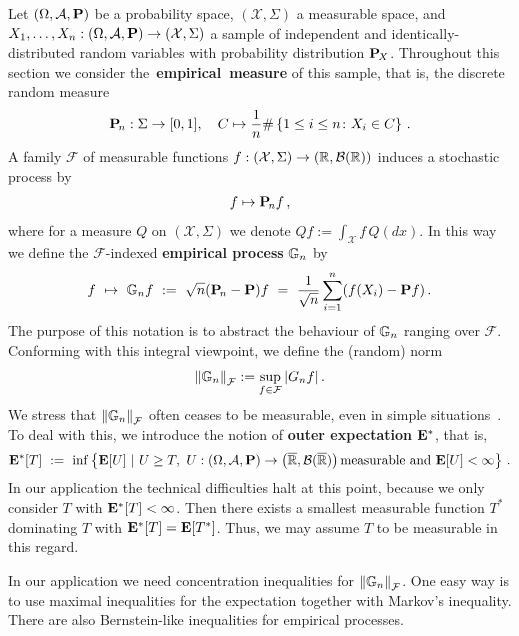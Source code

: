 
Let 
$
  \left( 
    \Omega,
    \mathcal{A},
    \P
  \right)
$
be a probability space,
$
  \left( 
    \mathcal{X},
    \Sigma
  \right)
$
a measurable space, and 
$
  X_1,\ldots,X_n
  :
  \left( 
    \Omega,
    \mathcal{A},
    \P
  \right)
  \to
  \left( 
    \mathcal{X},
    \Sigma
  \right)
$
a sample 
of independent and identically-distributed
random variables
with probability distribution $\P_{\!X}$.
Throughout this section we consider the~\textbf{empirical~measure}
of this sample, that is, the discrete random measure
\begin{gather}
  \P_{\!n}:\Sigma \to [0,1]
  ,
  \quad
  C\mapsto 
  \frac{1}{n}
  \#\left\{ 
1\le i \le n \colon
X_i \in C
  \right\}
  \,.
\end{gather}
A family $\mathcal{F}$ of measurable functions 
$
  f:
  \left( 
    \mathcal{X},
    \Sigma
  \right)
    \to
  \left( 
    \R,
    \mathcal{B}(\R)
  \right)
$
induces a stochastic process by
\begin{gather}
  f\mapsto \P_{\!n} f\,,
\end{gather}
where for a measure $Q$ on 
$
  \left( 
    \mathcal{X},
    \Sigma
  \right)
$
we denote $Q f:= \int_\mathcal{X}f\, Q(dx)$.
In this way we define the $\mathcal{F}\!$-indexed \textbf{empirical process} $\G_n$ by
\begin{gather}
  f
  \ 
  \mapsto
  \ 
  \G_n f 
  \ 
  :=
  \ 
  \sqrt{n}
  (\P_{\!n}-\P)f 
  \ 
  =
  \ 
  \frac{1}{\sqrt{n}}
  \sum_{i=1}^{n} 
  (
    f(X_i)
    -
    \P f
  )
  \,.
\end{gather}
The purpose of this notation is to abstract the behaviour of $\G_n$ ranging over $\mathcal{F}$.
Conforming with this integral viewpoint, we define the (random) norm
\begin{gather}
  \norm{\G_n}_\mathcal{F}
  :=
  \sup_
        { f \in \mathcal{F}}
        \left|
          G_n f
        \right|
        .
\end{gather}
We stress that 
$
  \norm{\G_n}_\mathcal{F}
$
often ceases to be measurable, even in simple situations~\cite[page 3]{vaart2013}.
To deal with this, we introduce the notion of \textbf{outer expectation} $\E^*$, that is,
\begin{gather}
  \E^*[T]
  \ 
  :=
  \ 
    \inf
  \left\{ 
    \E[U]
  \ 
  \lvert
  \ 
    U\ge T,
    \ 
    U:
  \left( 
    \Omega,
    \mathcal{A},
    \P
  \right)
  \to 
  \left( 
    \overline{\R},
    \mathcal{B}(\overline{\R})
  \right)
  \text{measurable and}
  \ 
  \E[U]<\infty
  \right\}
  \,.
\end{gather}
In our application the technical difficulties halt at this point, because we only consider $T$ with $\E^*[T]<\infty$. Then there exists a smallest measurable function $T^*$ dominating $T$ with
$\E^*[T]=\E[T^*]$. Thus, we may assume $T$ to be measurable in this regard.

In our application we need concentration inequalities for 
$
  \norm{\G_n}_\mathcal{F}
$.
One easy way is to use maximal inequalities for the expectation together with Markov's inequality. There are also Bernstein-like inequalities for empirical processes.




